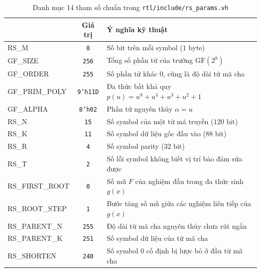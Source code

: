 \documentclass[11pt,a4paper]{report}
\begin{document}
\begin{table}[!htb]
    \centering
    \caption{Danh mục 14 tham số chuẩn trong \texttt{rtl/include/rs\_params.vh}}
    \label{tab:rs-14-params}
    \footnotesize
    \begin{tabularx}{\textwidth}{@{}>{\ttfamily}l c X@{}}
        \toprule
        \multicolumn{1}{@{}l}{\textbf{Macro trong header}} & \textbf{Giá trị} & \textbf{Ý nghĩa kỹ thuật} \\
        \midrule
        RS\_M          & \texttt{8}       & Số bit trên mỗi symbol ($1\text{ byte}$) \\
        GF\_SIZE       & \texttt{256}     & Tổng số phần tử của trường $\text{GF}(2^8)$ \\
        GF\_ORDER      & \texttt{255}     & Số phần tử khác $0$, cũng là độ dài từ mã cha \\
        GF\_PRIM\_POLY & \texttt{9'h11D}  & Đa thức bất khả quy $p(u) = u^8 + u^4 + u^3 + u^2 + 1$ \\
        GF\_ALPHA      & \texttt{8'h02}   & Phần tử nguyên thủy $\alpha = u$ \\
        RS\_N          & \texttt{15}      & Số symbol của một từ mã truyền ($120\text{ bit}$) \\
        RS\_K          & \texttt{11}      & Số symbol dữ liệu gốc đầu vào ($88\text{ bit}$) \\
        RS\_R          & \texttt{4}       & Số symbol parity ($32\text{ bit}$) \\
        RS\_T          & \texttt{2}       & Số lỗi symbol không biết vị trí bảo đảm sửa được \\
        RS\_FIRST\_ROOT & \texttt{0}      & Số mũ $F$ của nghiệm đầu trong đa thức sinh $g(x)$ \\
        RS\_ROOT\_STEP & \texttt{1}       & Bước tăng số mũ giữa các nghiệm liên tiếp của $g(x)$ \\
        RS\_PARENT\_N  & \texttt{255}     & Độ dài từ mã cha nguyên thủy chưa rút ngắn \\
        RS\_PARENT\_K  & \texttt{251}     & Số symbol dữ liệu của từ mã cha \\
        RS\_SHORTEN    & \texttt{240}     & Số symbol $0$ cố định bị lược bỏ ở đầu từ mã cha \\
        \bottomrule
    \end{tabularx}
\end{table}
\end{document}
